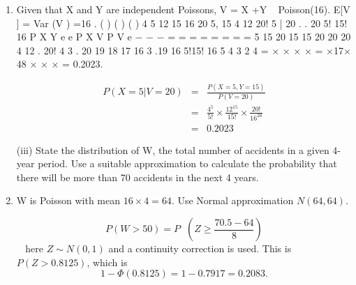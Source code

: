 \documentclass[a4paper,12pt]{article}
\begin{document}
\begin{enumerate}
\item  Given that X and Y are independent Poissons, V = X +Y ~ Poisson(16).
E[V ] = Var (V ) =16 .
( ) ( )
( )
4 5 12 15
16 20
5, 15 4 12 20! 5 | 20 . .
20 5! 15! 16
P X Y e e P X V
P V e
− −
−
= =
= = = =
=
=
5 15 20 15 15
20 20 20
4 12 . 20! 4 3 . 20 19 18 17 16 3 .19
16 5!15! 16 5 4 3 2 4
= × × × × = ×17× 48
× × ×
= 0.2023.

\begin{eqnarray*}
P(X=5|V=20) &=& \frac{P(X=5,Y=15)}{P(V=20)}\\
&=& \frac{4^5}{5!} \times \frac{12^{15}}{15!} \times \frac{20!}{16^{20}}\\
&=& 0.2023
\end{eqnarray*}

\newpage
\begin{framed}
(iii) State the distribution of W, the total number of accidents in a given 4-year
period. Use a suitable approximation to calculate the probability that there
will be more than 70 accidents in the next 4 years.


\end{framed}
\item  W is Poisson with mean $16 \times 4 = 64$. Use Normal approximation $N(64, 64)$.

\[P( W > 50) = P\left( Z \geq \frac{70.5-64}{8}\right)\] 
here $Z \sim N(0,1)$ and a continuity correction is
used. This is $P(Z > 0.8125)$, which is \[1-\Phi(0.8125) =1- 0.7917 = 0.2083.\]
\end{enumerate}
\end{document}
